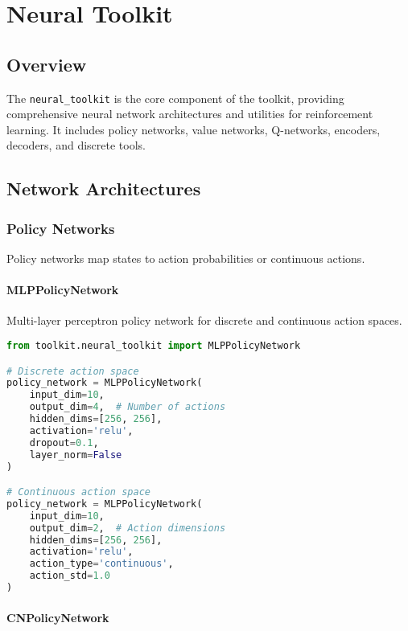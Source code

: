 \chapter{Neural Toolkit}

\section{Overview}

The \texttt{neural\_toolkit} is the core component of the toolkit, providing comprehensive neural network architectures and utilities for reinforcement learning. It includes policy networks, value networks, Q-networks, encoders, decoders, and discrete tools.

\section{Network Architectures}

\subsection{Policy Networks}

Policy networks map states to action probabilities or continuous actions.

\subsubsection{MLPPolicyNetwork}

Multi-layer perceptron policy network for discrete and continuous action spaces.

\begin{lstlisting}[language=python, caption=MLP Policy Network]
from toolkit.neural_toolkit import MLPPolicyNetwork

# Discrete action space
policy_network = MLPPolicyNetwork(
    input_dim=10,
    output_dim=4,  # Number of actions
    hidden_dims=[256, 256],
    activation='relu',
    dropout=0.1,
    layer_norm=False
)

# Continuous action space
policy_network = MLPPolicyNetwork(
    input_dim=10,
    output_dim=2,  # Action dimensions
    hidden_dims=[256, 256],
    activation='relu',
    action_type='continuous',
    action_std=1.0
)
\end{lstlisting}

\subsubsection{CNPolicyNetwork}

